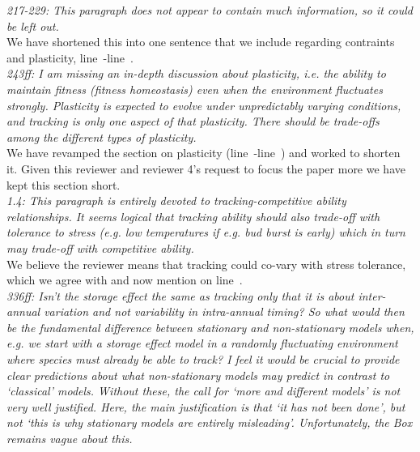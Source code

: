 \documentclass[11pt]{article}
\newcommand{\lr}[1]{line~\lineref{#1}}
\begin{document}
\emph{217-229: This paragraph does not appear to contain much information, so it could be left out.}\\

We have shortened this into one sentence that we include regarding contraints and plasticity, \lr{r1consS}-\lr{r1consE}.\\

\emph{243ff: I am missing an in-depth discussion about plasticity, i.e. the ability to maintain
fitness (fitness homeostasis) even when the environment fluctuates strongly. Plasticity is
expected to evolve under unpredictably varying conditions, and tracking is only one aspect of
that plasticity. There should be trade-offs among the different types of plasticity.}\\

We have revamped the section on plasticity (\lr{plasS}-\lr{plasE}) and worked to shorten it. Given this reviewer and reviewer 4's request to focus the paper more we have kept this section short.\\

\emph{1.4: This paragraph is entirely devoted to tracking-competitive ability relationships. It
seems logical that tracking ability should also trade-off with tolerance to stress (e.g. low
temperatures if e.g. bud burst is early) which in turn may trade-off with competitive
ability.}\\

We believe the reviewer means that tracking could co-vary with stress tolerance, which we agree with and now mention on \lr{r1stress}.\\

\emph{336ff: Isn’t the storage effect the same as tracking only that it is about inter-annual
variation and not variability in intra-annual timing? So what would then be the fundamental
difference between stationary and non-stationary models when, e.g. we start with a storage
effect model in a randomly fluctuating environment where species must already be able to
track? I feel it would be crucial to provide clear predictions about what non-stationary
models may predict in contrast to ‘classical’ models. Without these, the call for ‘more and
different models’ is not very well justified. Here, the main justification is that ‘it has
not been done’, but not ‘this is why stationary models are entirely misleading’.
Unfortunately, the Box remains vague about this.}\\

\\
\end{document}

